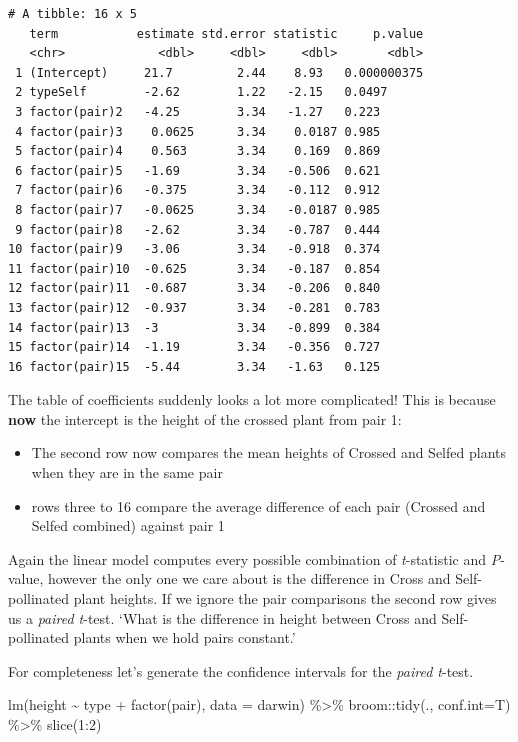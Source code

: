 \documentclass[
]{book}
\newenvironment{Shaded}{\begin{snugshade}}{\end{snugshade}}
\newcommand{\AttributeTok}[1]{\textcolor[rgb]{0.77,0.63,0.00}{#1}}
\newcommand{\DecValTok}[1]{\textcolor[rgb]{0.00,0.00,0.81}{#1}}
\newcommand{\FunctionTok}[1]{\textcolor[rgb]{0.00,0.00,0.00}{#1}}
\newcommand{\NormalTok}[1]{#1}
\newcommand{\SpecialCharTok}[1]{\textcolor[rgb]{0.00,0.00,0.00}{#1}}
\begin{document}
\begin{verbatim}
# A tibble: 16 x 5
   term           estimate std.error statistic     p.value
   <chr>             <dbl>     <dbl>     <dbl>       <dbl>
 1 (Intercept)     21.7         2.44    8.93   0.000000375
 2 typeSelf        -2.62        1.22   -2.15   0.0497     
 3 factor(pair)2   -4.25        3.34   -1.27   0.223      
 4 factor(pair)3    0.0625      3.34    0.0187 0.985      
 5 factor(pair)4    0.563       3.34    0.169  0.869      
 6 factor(pair)5   -1.69        3.34   -0.506  0.621      
 7 factor(pair)6   -0.375       3.34   -0.112  0.912      
 8 factor(pair)7   -0.0625      3.34   -0.0187 0.985      
 9 factor(pair)8   -2.62        3.34   -0.787  0.444      
10 factor(pair)9   -3.06        3.34   -0.918  0.374      
11 factor(pair)10  -0.625       3.34   -0.187  0.854      
12 factor(pair)11  -0.687       3.34   -0.206  0.840      
13 factor(pair)12  -0.937       3.34   -0.281  0.783      
14 factor(pair)13  -3           3.34   -0.899  0.384      
15 factor(pair)14  -1.19        3.34   -0.356  0.727      
16 factor(pair)15  -5.44        3.34   -1.63   0.125  
\end{verbatim}

The table of coefficients suddenly looks a lot more complicated! This is because \textbf{now} the intercept is the height of the crossed plant from pair 1:

\begin{itemize}
\item
  The second row now compares the mean heights of Crossed and Selfed plants when they are in the same pair
\item
  rows three to 16 compare the average difference of each pair (Crossed and Selfed combined) against pair 1
\end{itemize}

Again the linear model computes every possible combination of \emph{t}-statistic and \emph{P}-value, however the only one we care about is the difference in Cross and Self-pollinated plant heights. If we ignore the pair comparisons the second row gives us a \emph{paired t}-test. `What is the difference in height between Cross and Self-pollinated plants when we hold pairs constant.'

For completeness let's generate the confidence intervals for the \emph{paired t}-test.

\begin{Shaded}
\begin{Highlighting}[]
\FunctionTok{lm}\NormalTok{(height }\SpecialCharTok{\textasciitilde{}}\NormalTok{ type }\SpecialCharTok{+} \FunctionTok{factor}\NormalTok{(pair), }\AttributeTok{data =}\NormalTok{ darwin) }\SpecialCharTok{\%\textgreater{}\%} 
\NormalTok{  broom}\SpecialCharTok{::}\FunctionTok{tidy}\NormalTok{(., }\AttributeTok{conf.int=}\NormalTok{T) }\SpecialCharTok{\%\textgreater{}\%} 
  \FunctionTok{slice}\NormalTok{(}\DecValTok{1}\SpecialCharTok{:}\DecValTok{2}\NormalTok{)}
\end{Highlighting}
\end{Shaded}
\end{document}
